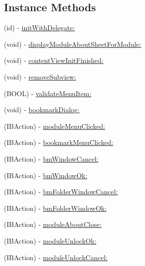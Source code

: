 \subsection*{Instance Methods}
\begin{DoxyCompactItemize}
\item 
(id) -\/ \hyperlink{interface_left_side_bar_view_controller_a31987d71b58e0520588676a4f6896d2c}{init\-With\-Delegate\-:}
\item 
(void) -\/ \hyperlink{interface_left_side_bar_view_controller_a254da93c19ddea8db470cf653b8b5354}{display\-Module\-About\-Sheet\-For\-Module\-:}
\item 
(void) -\/ \hyperlink{interface_left_side_bar_view_controller_a0bd73ec236f8055ac6566b39ddf66add}{content\-View\-Init\-Finished\-:}
\item 
(void) -\/ \hyperlink{interface_left_side_bar_view_controller_afc97bbb7e9b0d2f6b9fd995ada16f4a1}{remove\-Subview\-:}
\item 
(B\-O\-O\-L) -\/ \hyperlink{interface_left_side_bar_view_controller_ad9cd530132fccc2ff65d7a38fcde1af1}{validate\-Menu\-Item\-:}
\item 
(void) -\/ \hyperlink{interface_left_side_bar_view_controller_a7f5220e09cc16cd124dd9948224af798}{bookmark\-Dialog\-:}
\item 
(I\-B\-Action) -\/ \hyperlink{interface_left_side_bar_view_controller_a8b80eb14af29e14c1a8ab3da2290d56c}{module\-Menu\-Clicked\-:}
\item 
(I\-B\-Action) -\/ \hyperlink{interface_left_side_bar_view_controller_ab01419cc59d0ad5b57256c641c95125a}{bookmark\-Menu\-Clicked\-:}
\item 
(I\-B\-Action) -\/ \hyperlink{interface_left_side_bar_view_controller_afecdae23222ee7bdd84a7464d85a7641}{bm\-Window\-Cancel\-:}
\item 
(I\-B\-Action) -\/ \hyperlink{interface_left_side_bar_view_controller_a81c33b4f62894e117ad3086d55bbf6f9}{bm\-Window\-Ok\-:}
\item 
(I\-B\-Action) -\/ \hyperlink{interface_left_side_bar_view_controller_a2e4ec4e46ec8fbcbdb9d1a269f9fa3b7}{bm\-Folder\-Window\-Cancel\-:}
\item 
(I\-B\-Action) -\/ \hyperlink{interface_left_side_bar_view_controller_a473fd3c1443a5bd29433db7661dc5350}{bm\-Folder\-Window\-Ok\-:}
\item 
(I\-B\-Action) -\/ \hyperlink{interface_left_side_bar_view_controller_a9c4f0bca8ca5eb88e9db21f109d58fc4}{module\-About\-Close\-:}
\item 
(I\-B\-Action) -\/ \hyperlink{interface_left_side_bar_view_controller_ab08ab8821de1e19a8b4a5f904c9abdcc}{module\-Unlock\-Ok\-:}
\item 
(I\-B\-Action) -\/ \hyperlink{interface_left_side_bar_view_controller_ac167dc214a9809da53b0867db851056c}{module\-Unlock\-Cancel\-:}
\end{DoxyCompactItemize}

